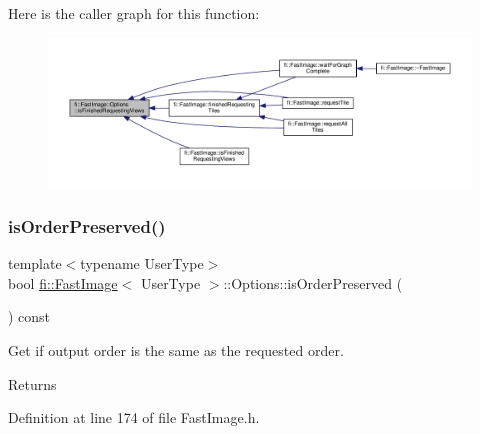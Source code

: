 Here is the caller graph for this function\+:
\nopagebreak
\begin{figure}[H]
\begin{center}
\leavevmode
\includegraphics[width=350pt]{dc/db9/classfi_1_1FastImage_1_1Options_a3cfa4c38cdb0b2018c812bbcb8e9dd63_icgraph}
\end{center}
\end{figure}
\mbox{\label{classfi_1_1FastImage_1_1Options_a088e2f97d9c9297fd6151c030820bd62}} 
\subsubsection{\texorpdfstring{is\+Order\+Preserved()}{isOrderPreserved()}}
{\footnotesize\ttfamily template$<$typename User\+Type$>$ \\
bool \hyperlink{classfi_1_1FastImage}{fi\+::\+Fast\+Image}$<$ User\+Type $>$\+::Options\+::is\+Order\+Preserved (\begin{DoxyParamCaption}{ }\end{DoxyParamCaption}) const\hspace{0.3cm}{\ttfamily [inline]}}



Get if output order is the same as the requested order. 

\begin{DoxyReturn}{Returns}

\end{DoxyReturn}


Definition at line 174 of file Fast\+Image.\+h.

